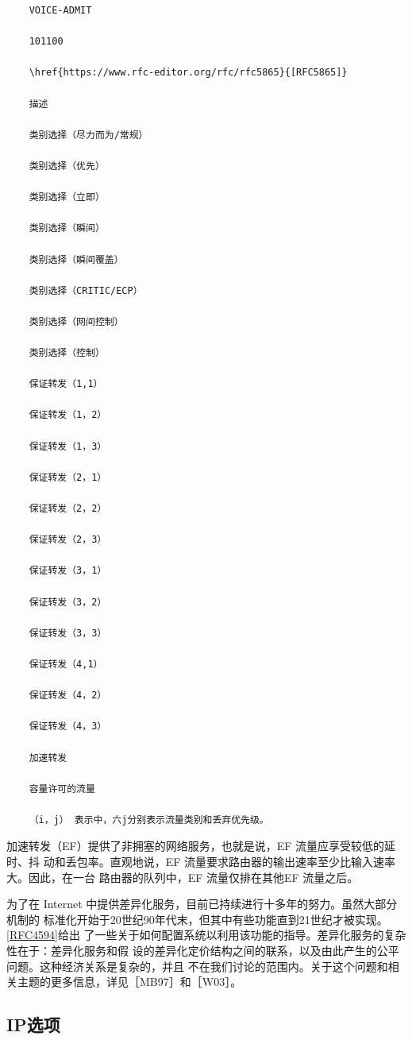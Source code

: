 \begin{verbatim}
    VOICE-ADMIT

    101100

    \href{https://www.rfc-editor.org/rfc/rfc5865}{[RFC5865]}

    描述

    类别选择（尽力而为/常规）

    类别选择（优先）

    类别选择（立即）

    类别选择（瞬间）

    类别选择（瞬间覆盖）

    类别选择（CRITIC/ECP）

    类别选择（网间控制）

    类别选择（控制）

    保证转发（1,1）

    保证转发（1，2）

    保证转发（1，3）

    保证转发（2，1）

    保证转发（2，2）

    保证转发（2，3）

    保证转发（3，1）

    保证转发（3，2）

    保证转发（3，3）

    保证转发（4,1）

    保证转发（4，2）

    保证转发（4，3）

    加速转发

    容量许可的流量

    （i，j） 表示中，六j分别表示流量类别和丢弃优先级。
\end{verbatim}

加速转发（EF）提供了非拥塞的网络服务，也就是说，EF 流量应享受较低的延时、抖
动和丢包率。直观地说，EF 流量要求路由器的输出速率至少比输入速率大。因此，在一台
路由器的队列中，EF 流量仅排在其他EF 流量之后。

为了在 Internet 中提供差异化服务，目前已持续进行十多年的努力。虽然大部分机制的
标准化开始于20世纪90年代末，但其中有些功能直到21世纪才被实现。\href{https://www.rfc-editor.org/rfc/rfc4594}{[RFC4594]}给出
了一些关于如何配置系统以利用该功能的指导。差异化服务的复杂性在于：差异化服务和假
设的差异化定价结构之间的联系，以及由此产生的公平问题。这种经济关系是复杂的，并且
不在我们讨论的范围内。关于这个问题和相关主题的更多信息，详见［MB97］和［W03］。

\subsection{IP选项}

